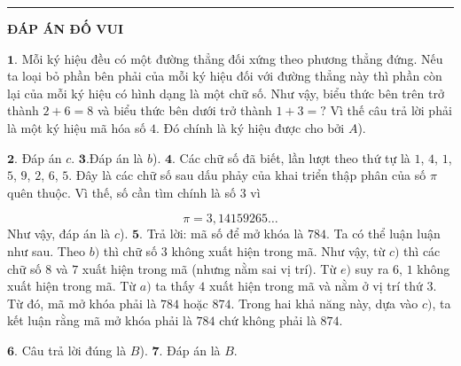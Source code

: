 \rule{1\textwidth}{0.1pt}
\begin{center}
	\textbf{ĐÁP ÁN ĐỐ VUI}
\end{center}

$\pmb{1.}$
Mỗi ký hiệu đều có một đường thẳng đối xứng theo phương thẳng đứng. Nếu ta loại bỏ phần bên phải của mỗi ký hiệu đối với đường thẳng này thì phần còn lại của mỗi ký hiệu có hình dạng là một chữ số. Như vậy, biểu thức bên trên trở thành $2+6=8$ và biểu thức bên dưới trở thành $1+3=?$ Vì thế câu trả lời phải là một ký hiệu mã hóa số $4$. Đó chính là ký hiệu được cho bởi $A$).
\vskip 0.1cm

$\pmb{2.}$ Đáp án $c$.
\vskip 0.1cm
$\pmb{3.}$Đáp án là $b$).
\vskip 0.1cm
$\pmb{4.}$ Các chữ số đã biết, lần lượt theo thứ tự là $1$, $4$, $1$, $5$, $9$, $2$, $6$, $5$. Đây là các chữ số sau dấu phảy của khai triển thập phân của số $\pi$ quên thuộc. Vì thế, số cần tìm chính là số $3$ vì

$$\pi = 3, 14159265\ldots$$
Như vậy, đáp án là $c$).
\vskip 0.1cm
$\pmb{5.}$ Trả lời: mã số để mở khóa là $784$.
\vskip 0.1cm
Ta có thể luận luận như sau. Theo $b)$ thì chữ số  $3$  không xuất hiện trong mã. Như vậy, từ $c)$ thì các chữ số  $8$ và $7$ xuất hiện trong mã (nhưng nằm sai vị trí). Từ $e)$ suy ra $6$, $1$ không xuất hiện trong mã. Từ $a)$  ta thấy $4$ xuất hiện trong mã và nằm ở vị trí thứ $3$. Từ đó, mã mở khóa phải là $784$ hoặc $874$. Trong hai khả năng này, dựa vào $c)$, ta kết luận rằng mã mở khóa phải là $784$ chứ không phải là $874$.
\vskip 0.1cm

$\pmb{6.}$ Câu trả lời đúng là $B$).
\vskip 0.1cm
$\pmb{7.}$ Đáp án là $B$.
